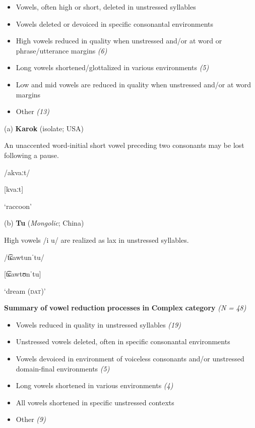 \begin{itemize}
\item 
Vowels, often high or short, deleted in unstressed syllables \textit{}

\item 
Vowels deleted or devoiced in specific consonantal environments \textit{}

\item 
High vowels reduced in quality when unstressed and/or at word or phrase/utterance margins \textit{(6)}

\item 
Long vowels shortened/glottalized in various environments \textit{(5)}

\item 
Low and mid vowels are reduced in quality when unstressed and/or at word margins \textit{}

\item 
Other \textit{(13)}

\end{itemize}

(a)   \textbf{Karok} (isolate; USA)

An unaccented word-initial short vowel preceding two consonants may be lost following a pause.

/akvaːt/

[kvaːt]

‘raccoon’

\citep[53]{Bright1957}

(b)  \textbf{Tu} (\textit{Mongolic}; China)

High vowels /i u/ are realized as lax in unstressed syllables. 

/t͡ɕawtunˈtu/

[t͡ɕawtʊnˈtu]

‘dream (\textsc{dat})’

\citep[35]{Slater2003}
\z

\ea\label{ex:(6.18)}
  \textbf{Summary} \textbf{of} \textbf{vowel} \textbf{reduction} \textbf{processes} \textbf{in} \textbf{Complex} \textbf{category} \textit{(N} \textit{=} \textit{48)}

\begin{itemize}
\item 
Vowels reduced in quality in unstressed syllables \textit{(19)}

\item 
Unstressed vowels deleted, often in specific consonantal environments \textit{}

\item 
Vowels devoiced in environment of voiceless consonants and/or unstressed domain-final environments \textit{(5)}

\item 
Long vowels shortened in various environments \textit{(4)}

\item 
All vowels shortened in specific unstressed contexts \textit{}

\item 
Other \textit{(9)}

\end{itemize}

